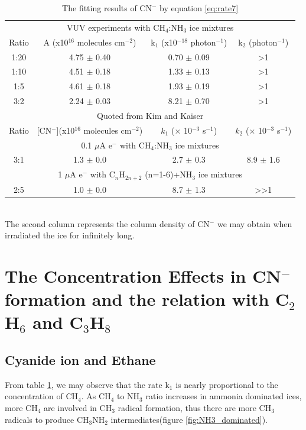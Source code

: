 \begin{table}[htbp]
\caption{The fitting results of CN$^-$ by equation \ref{eq:rate7}}
\label{tab:CNrate}
\begin{tabular}{cccc}
\hline
\hline
\multicolumn{4}{c}{VUV experiments with CH$_4$:NH$_3$ ice mixtures}\\
Ratio & A (x10$^{16}$ molecules cm$^{-2}$) & k$_1$ (x10$^{-18}$ photon$^{-1}$) & k$_2$ (photon$^{-1}$)\\
\hline
1:20 & 4.75 $\pm$ 0.40 & 0.70 $\pm$ 0.09 & >1 \\
1:10 & 4.51 $\pm$ 0.18 & 1.33 $\pm$ 0.13 & >1 \\
1:5 & 4.61 $\pm$ 0.18 & 1.93 $\pm$ 0.19 & >1 \\
3:2 & 2.24 $\pm$ 0.03 & 8.21 $\pm$ 0.70 & >1 \\
\hline
\hline
\multicolumn{4}{c}{Quoted from Kim and Kaiser\cite{kim}} \\
Ratio & [CN$^-$](x10$^{16}$ molecules cm$^{-2}$) & $k_1$ ($\times$ 10$^{-3}$ s$^{-1}$) &  $k_2$  ($\times$ 10$^{-3}$ s$^{-1}$)\\
\hline
\multicolumn{4}{c}{0.1 $\mu$A e$^-$ with CH$_4$:NH$_3$ ice mixtures}\\
3:1 & 1.3 $\pm$ 0.0 & 2.7 $\pm$ 0.3 & 8.9 $\pm$ 1.6 \\
\hline
\multicolumn{4}{c}{1 $\mu$A e$^-$ with C$_n$H$_{2n+2}$ (n=1-6)+NH$_3$ ice mixtures}\\
2:5 & 1.0 $\pm$ 0.0 & 8.7 $\pm$ 1.3 & >>1 \\
\hline
\end{tabular}\\
The second column represents the column density of CN$^-$ we may obtain when irradiated the ice for infinitely long.\
\end{table}

\section{The Concentration Effects in CN$^-$formation and the relation with C$_2$H$_6$ and C$_3$H$_8$}



\subsection{Cyanide ion and Ethane}

From table \ref{tab:CNrate}, we may observe that the rate k$_1$ is nearly proportional to the concentration of CH$_4$.  As CH$_4$ to NH$_3$ ratio increases in ammonia dominated ices, more CH$_4$ are involved in CH$_3$ radical formation, thus there are more CH$_3$ radicals to produce CH$_3$NH$_2$ intermediates(figure \ref{fig:NH3_dominated}).\\

